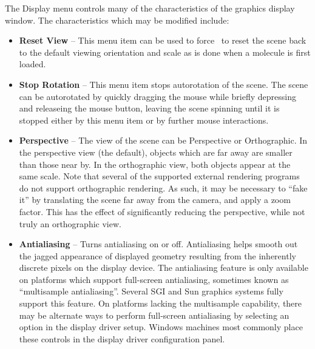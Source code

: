 The {\sf Display} menu controls many of the characteristics of the graphics
display window.  The characteristics which may be modified include:
\begin{itemize}
  \item{\bf Reset View} --
This menu item can be used to force \VMD\ to reset the scene back to the
default viewing orientation and scale as is done when a molecule is 
first loaded.
  
  \item{\bf Stop Rotation} --
This menu item stops autorotation of the scene.  The scene can be 
autorotated by quickly dragging the mouse while briefly depressing 
and releaseing the mouse button, leaving the scene spinning until it
is stopped either by this menu item or by further mouse interactions. 

  \item{\bf Perspective} --
The view of the scene can be {\sf Perspective} or {\sf Orthographic}. 
In the perspective view (the default), objects which are far away are
smaller than those near by.  In the orthographic view, both objects
appear at the same scale.  Note that several of the supported external
rendering programs do not support orthographic rendering.  As such, it may
be necessary to ``fake it'' by translating the scene far away from the 
camera, and apply a zoom factor.  This has the effect of significantly
reducing the perspective, while not truly an orthographic view.

  \item {\bf Antialiasing} --
Turns antialiasing on or off.  Antialiasing helps smooth out
the jagged appearance of displayed geometry resulting from the inherently 
discrete pixels on the display device.  The antialiasing feature is 
only available on platforms which support full-screen antialiasing,
sometimes known as ``multisample antialiasing''.  Several SGI and Sun
graphics systems fully support this feature.  
On platforms lacking the multisample
capability, there may be alternate ways to perform full-screen antialiasing
by selecting an option in the display driver setup.  Windows machines most
commonly place these controls in the display driver configuration panel.


\end{itemize}
